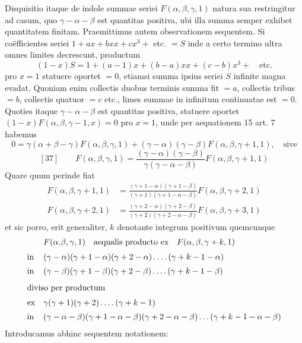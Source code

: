 Disquisitio itaque de indole summae seriei $F(\alpha,\beta,\gamma,1)$ natura sua restringitur ad casum, quo $\gamma-\alpha-\beta$ est quantitas positiva, ubi illa summa semper
exhibet quantitatem finitam. Praemittimus autem observationem sequentem. Si
coëfficientes seriei $1+ax+bxx+cx^3+$ etc. $=S$ inde a certo termino ultra
omnes limites decrescunt, productum
\[
(1-x)S=1+(a-1)x+(b-a)xx+(c-b)x^3+\quad\text{etc.}
\]
pro $x=1$ statuere oportet $=0$, etiamsi summa ipsius seriei $S$ infinite magna
evadat. Quoniam enim collectis duobus terminis summa fit $=a$, collectis tribus $=b$, collectis quatuor $=c$ etc., limes summae in infinitum continuatae
est $=0$. Quoties itaque $\gamma-\alpha-\beta$ est quantitas positiva, statuere oportet
$(1-x)F(\alpha,\beta,\gamma-1,x)=0$ pro $x=1$, unde per aequationem 15 art. 7 habemus
\[
0=\gamma(\alpha+\beta-\gamma)F(\alpha,\beta,\gamma,1)+(\gamma-\alpha)(\gamma-\beta)F(\alpha,\beta,\gamma+1,1),\quad\text{sive}
\]
\[
[37]\qquad F(\alpha,\beta,\gamma,1)=\frac{(\gamma-\alpha)(\gamma-\beta)}{\gamma(\gamma-\alpha-\beta)}F(\alpha,\beta,\gamma+1,1)
\]
Quare quum perinde fiat
\[
\begin{aligned}
F(\alpha,\beta,\gamma+1,1)&=\frac{(\gamma+1-\alpha)(\gamma+1-\beta)}{(\gamma+1)(\gamma+1-\alpha-\beta)}F(\alpha,\beta,\gamma+2,1)\\[6pt]
F(\alpha,\beta,\gamma+2,1)&=\frac{(\gamma+2-\alpha)(\gamma+2-\beta)}{(\gamma+2)(\gamma+2-\alpha-\beta)}F(\alpha,\beta,\gamma+3,1)
\end{aligned}
\]
et sic porro, erit generaliter, $k$ denotante integrum positivum quemcunque
\[
\begin{array}{@{}ll@{}}
&F(\alpha.\beta,\gamma,1)\quad\text{aequalis producto ex}\quad F(\alpha,\beta,\gamma+k,1)\\[6pt]
\text{in}&(\gamma-\alpha)(\gamma+1-\alpha)(\gamma+2-\alpha)\mathinner{.\,.\,.\,.}(\gamma+k-1-\alpha)\\[5pt]
\text{in}&(\gamma-\beta)(\gamma+1-\beta)(\gamma+2-\beta)\mathinner{.\,.\,.\,.}(\gamma+k-1-\beta)\\[8pt]
\multicolumn{2}{@{}l@{}}{\text{diviso per productum}}\\[6pt]
\text{ex}&\gamma(\gamma+1)(\gamma+2)\mathinner{.\,.\,.\,.}(\gamma+k-1)\\[5pt]
\text{in}&(\gamma-\alpha-\beta)(\gamma+1-\alpha-\beta)(\gamma+2-\alpha-\beta)\mathinner{.\,.\,.}(\gamma+k-1-\alpha-\beta)
\end{array}
\]
Introducamus abhinc sequentem notationem:
